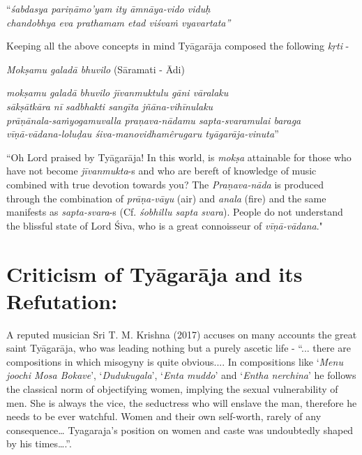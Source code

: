 \begin{longquote}
“\textit{śabdasya pariṇāmo’yam ity āmnāya-vido viduḥ }\\ \textit{chandobhya eva prathamam etad viśvaṁ vyavartata”} 
\end{longquote}

Keeping all the above concepts in mind Tyāgarāja composed the following \textit{kṛti} -

\textit{Mokṣamu galadā bhuvilo} (Sāramati - Ādi)

\begin{longquote}
\textit{mokṣamu galadā bhuvilo jīvanmuktulu gāni vāralaku}\\ \textit{sākṣātkāra nī sadbhakti sangīta jñāna-vihīnulaku}\\ \textit{prāṇānala-saṁyogamuvalla praṇava-nādamu sapta-svaramulai baraga}\\ \textit{vīṇā-vādana-loluḍau śiva-manovidhamêrugaru tyāgarāja-vinuta}”
\end{longquote}

``Oh Lord praised by Tyāgarāja! In this world, is \textit{mokṣa} attainable for those who have not become \textit{jīvanmukta}-s and who are bereft of knowledge of music combined with true devotion towards you? The \textit{Praṇava-nāda} is produced through the combination of \textit{prāṇa-vāyu} (air) and \textit{anala} (fire) and the same manifests as \textit{sapta-svara}-s (Cf. \textit{śobhillu sapta svara}). People do not understand the blissful state of Lord Śiva, who is a great connoisseur of \textit{vīṇā-vādana}."


\section*{Criticism of Tyāgarāja and its Refutation:}


A reputed musician Sri T. M. Krishna (2017) accuses on many accounts the great saint Tyāgarāja, who was leading nothing but a purely ascetic life - “... there are compositions in which misogyny is quite obvious.... In compositions like ‘\textit{Menu joochi Mosa Bokave}’, ‘\textit{Dudukugala}’, ‘\textit{Enta muddo}’ and ‘\textit{Entha nerchina}’ he follows the classical norm of objectifying women, implying the sexual vulnerability of men. She is always the vice, the seductress who will enslave the man, therefore he needs to be ever watchful. Women and their own self-worth, rarely of any consequence… Tyagaraja’s position on women and caste was undoubtedly shaped by his times….”.

